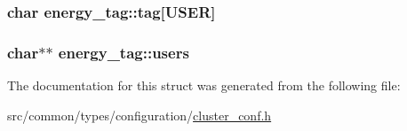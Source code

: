 \subsubsection[{\texorpdfstring{tag}{tag}}]{\setlength{\rightskip}{0pt plus 5cm}char energy\+\_\+tag\+::tag\mbox{[}{\bf U\+S\+ER}\mbox{]}}\hypertarget{structenergy__tag_a3a76c36daf0b2abcc96e5c75d2a14b97}{}\label{structenergy__tag_a3a76c36daf0b2abcc96e5c75d2a14b97}
\subsubsection[{\texorpdfstring{users}{users}}]{\setlength{\rightskip}{0pt plus 5cm}char$\ast$$\ast$ energy\+\_\+tag\+::users}\hypertarget{structenergy__tag_a4aacb2282f8644bc3db3fef21effc8bd}{}\label{structenergy__tag_a4aacb2282f8644bc3db3fef21effc8bd}


The documentation for this struct was generated from the following file\+:\begin{DoxyCompactItemize}
\item 
src/common/types/configuration/\hyperlink{cluster__conf_8h}{cluster\+\_\+conf.\+h}\end{DoxyCompactItemize}
